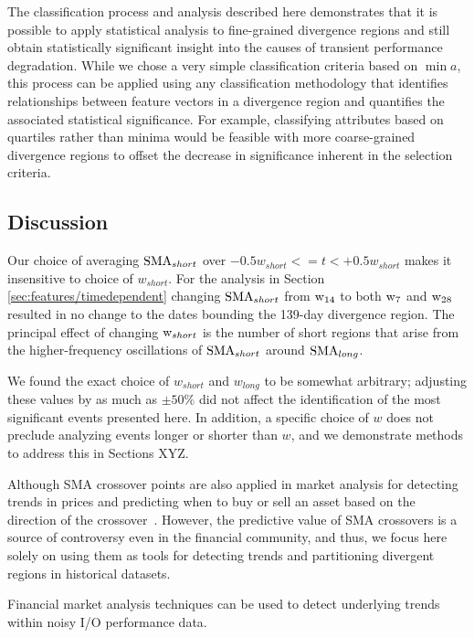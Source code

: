 The classification process and analysis described here demonstrates that it is possible to apply statistical analysis to fine-grained divergence regions and still obtain statistically significant insight into the causes of transient performance degradation.
While we chose a very simple classification criteria based on $\min{a}$, this process can be applied using any classification methodology that identifies relationships between feature vectors in a divergence region and quantifies the associated statistical significance.
For example, classifying attributes based on quartiles rather than minima would be feasible with more coarse-grained divergence regions to offset the decrease in significance inherent in the selection criteria.

\subsection {Discussion}
\label{sec:results/discussion}


Our choice of averaging $\textup{SMA}_{short}$ over ${-0.5w_{short} <= t < +0.5w_{short}}$ makes it insensitive to choice of $w_{short}$.
For the analysis in Section \ref{sec:features/timedependent} changing $\textup{SMA}_{short}$ from $\textup{w}_{14}$ to both $\textup{w}_{7}$ and $\textup{w}_{28}$ resulted in no change to the dates bounding the 139-day divergence region.
The principal effect of changing $\textup{w}_{short}$ is the number of short regions that arise from the higher-frequency oscillations of $\textup{SMA}_{short}$ around $\textup{SMA}_{long}$.


We found the exact choice of $w_{short}$ and $w_{long}$ to be somewhat arbitrary; adjusting these values by as much as $\pm 50\%$ did not affect the identification of the most significant events presented here.
In addition, a specific choice of $w$ does not preclude analyzing events longer or shorter than $w$, and we demonstrate methods to address this in Sections XYZ.

Although SMA crossover points are also applied in market analysis for detecting trends in prices and predicting when to buy or sell an asset based on the direction of the crossover~\cite{brock1992simple}.
However, the predictive value of SMA crossovers is a source of controversy even in the financial community, and thus, we focus here solely on using them as tools for detecting trends and partitioning divergent regions in historical datasets.

Financial market analysis techniques can be used to detect underlying trends within noisy I/O performance data.

